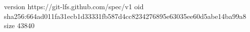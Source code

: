 version https://git-lfs.github.com/spec/v1
oid sha256:664ad011fa31ecb1d33331fb587d4cc8234276895e63035ee60d5abe14ba99a8
size 43840
